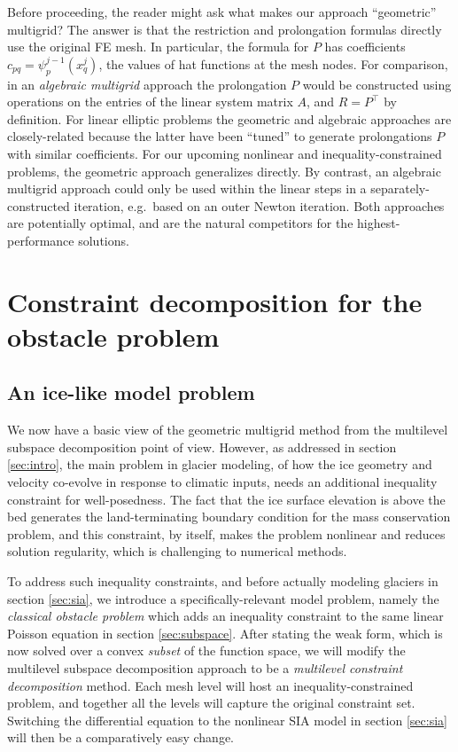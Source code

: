 \documentclass[letterpaper,final,12pt,reqno]{amsart}
\theoremstyle{claim}
\numberwithin{equation}{section}
\numberwithin{figure}{section}
\numberwithin{table}{section}
\numberwithin{theorem}{section}
\begin{document}
Before proceeding, the reader might ask what makes our approach ``geometric'' multigrid?  The answer is that the restriction and prolongation formulas directly use the original FE mesh.  In particular, the formula for $P$ has coefficients $c_{pq} = \psi_p^{j-1}(x_q^j)$, the values of hat functions at the mesh nodes.  For comparison, in an \emph{algebraic multigrid} \cite{Trottenbergetal2001} approach the prolongation $P$ would be constructed using operations on the entries of the linear system matrix $A$, and $R=P^\top$ by definition.  For linear elliptic problems the geometric and algebraic approaches are closely-related because the latter have been ``tuned'' to generate prolongations $P$ with similar coefficients.  For our upcoming nonlinear and inequality-constrained problems, the geometric approach generalizes directly.  By contrast, an algebraic multigrid approach could only be used within the linear steps in a separately-constructed iteration, e.g.~based on an outer Newton iteration.  Both approaches are potentially optimal, and are the natural competitors for the highest-performance solutions.


\section{Constraint decomposition for the obstacle problem} \label{sec:obstacle}

\subsection*{An ice-like model problem}  We now have a basic view of the geometric multigrid method from the multilevel subspace decomposition point of view.  However, as addressed in section \ref{sec:intro}, the main problem in glacier modeling, of how the ice geometry and velocity co-evolve in response to climatic inputs, needs an additional inequality constraint for well-posedness.  The fact that the ice surface elevation is above the bed generates the land-terminating boundary condition for the mass conservation problem, and this constraint, by itself, makes the problem nonlinear and reduces solution regularity, which is challenging to numerical methods.

To address such inequality constraints, and before actually modeling glaciers in section \ref{sec:sia}, we introduce a specifically-relevant model problem, namely the \emph{classical obstacle problem} which adds an inequality constraint to the same linear Poisson equation in section \ref{sec:subspace}.  After stating the weak form, which is now solved over a convex \emph{subset} of the function space, we will modify the multilevel subspace decomposition approach to be a \emph{multilevel constraint decomposition} method.  Each mesh level will host an inequality-constrained problem, and together all the levels will capture the original constraint set.  Switching the differential equation to the nonlinear SIA model in section \ref{sec:sia} will then be a comparatively easy change.
\end{document}
